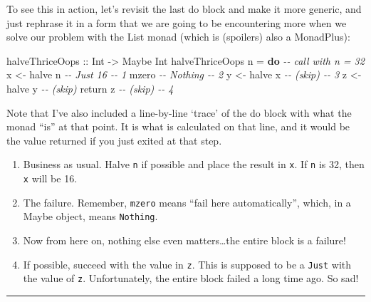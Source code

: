 \documentclass[]{article}
\newenvironment{Shaded}{}{}
\newcommand{\CommentTok}[1]{\textcolor[rgb]{0.38,0.63,0.69}{\textit{#1}}}
\newcommand{\DataTypeTok}[1]{\textcolor[rgb]{0.56,0.13,0.00}{#1}}
\newcommand{\FunctionTok}[1]{\textcolor[rgb]{0.02,0.16,0.49}{#1}}
\newcommand{\KeywordTok}[1]{\textcolor[rgb]{0.00,0.44,0.13}{\textbf{#1}}}
\newcommand{\NormalTok}[1]{#1}
\newcommand{\OtherTok}[1]{\textcolor[rgb]{0.00,0.44,0.13}{#1}}
\begin{document}
To see this in action, let's revisit the last do block and make it more generic,
and just rephrase it in a form that we are going to be encountering more when we
solve our problem with the List monad (which is (spoilers) also a MonadPlus):

\begin{Shaded}
\begin{Highlighting}[]
\OtherTok{halveThriceOops ::} \DataTypeTok{Int} \OtherTok{{-}\textgreater{}} \DataTypeTok{Maybe} \DataTypeTok{Int}
\NormalTok{halveThriceOops n }\OtherTok{=} \KeywordTok{do}          \CommentTok{{-}{-} call with n = 32}
\NormalTok{    x }\OtherTok{\textless{}{-}}\NormalTok{ halve n                }\CommentTok{{-}{-} Just 16              {-}{-} 1}
\NormalTok{    mzero                       }\CommentTok{{-}{-} Nothing              {-}{-} 2}
\NormalTok{    y }\OtherTok{\textless{}{-}}\NormalTok{ halve x                }\CommentTok{{-}{-} (skip)               {-}{-} 3}
\NormalTok{    z }\OtherTok{\textless{}{-}}\NormalTok{ halve y                }\CommentTok{{-}{-} (skip)}
    \FunctionTok{return}\NormalTok{ z                    }\CommentTok{{-}{-} (skip)               {-}{-} 4}
\end{Highlighting}
\end{Shaded}

Note that I've also included a line-by-line `trace' of the do block with what
the monad ``is'' at that point. It is what is calculated on that line, and it
would be the value returned if you just exited at that step.

\begin{enumerate}
\def\labelenumi{\arabic{enumi}.}
\tightlist
\item
  Business as usual. Halve \texttt{n} if possible and place the result in
  \texttt{x}. If \texttt{n} is 32, then \texttt{x} will be 16.
\item
  The failure. Remember, \texttt{mzero} means ``fail here automatically'',
  which, in a Maybe object, means \texttt{Nothing}.
\item
  Now from here on, nothing else even matters\ldots the entire block is a
  failure!
\item
  If possible, succeed with the value in \texttt{z}. This is supposed to be a
  \texttt{Just} with the value of \texttt{z}. Unfortunately, the entire block
  failed a long time ago. So sad!
\end{enumerate}

\begin{center}\rule{0.5\linewidth}{0.5pt}\end{center}
\end{document}
